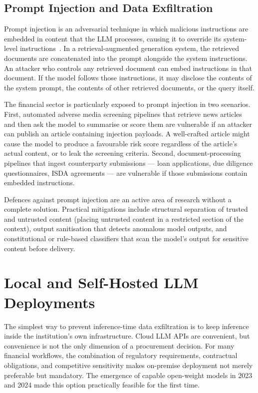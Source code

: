 \subsection{Prompt Injection and Data Exfiltration}
\label{sec:ch15-injection}

Prompt injection is an adversarial technique in which malicious instructions are embedded in content that the LLM processes, causing it to override its system-level instructions~\citep{perez2022ignore}. In a retrieval-augmented generation system, the retrieved documents are concatenated into the prompt alongside the system instructions. An attacker who controls any retrieved document can embed instructions in that document. If the model follows those instructions, it may disclose the contents of the system prompt, the contents of other retrieved documents, or the query itself.

The financial sector is particularly exposed to prompt injection in two scenarios. First, automated adverse media screening pipelines that retrieve news articles and then ask the model to summarise or score them are vulnerable if an attacker can publish an article containing injection payloads. A well-crafted article might cause the model to produce a favourable risk score regardless of the article's actual content, or to leak the screening criteria. Second, document-processing pipelines that ingest counterparty submissions — loan applications, due diligence questionnaires, ISDA agreements — are vulnerable if those submissions contain embedded instructions.

Defences against prompt injection are an active area of research without a complete solution. Practical mitigations include structural separation of trusted and untrusted content (placing untrusted content in a restricted section of the context), output sanitisation that detects anomalous model outputs, and constitutional or rule-based classifiers that scan the model's output for sensitive content before delivery.

\section{Local and Self-Hosted LLM Deployments}
\label{sec:ch15-local-models}

\begin{context}
The simplest way to prevent inference-time data exfiltration is to keep inference inside the institution's own infrastructure. Cloud LLM APIs are convenient, but convenience is not the only dimension of a procurement decision. For many financial workflows, the combination of regulatory requirements, contractual obligations, and competitive sensitivity makes on-premise deployment not merely preferable but mandatory. The emergence of capable open-weight models in 2023 and 2024 made this option practically feasible for the first time.
\end{context}

